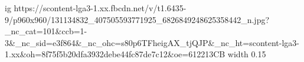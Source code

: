  
 
 
 
 

\par
\ifcmt
  ig https://scontent-lga3-1.xx.fbcdn.net/v/t1.6435-9/p960x960/131134832_407505593771925_6826849248625358442_n.jpg?_nc_cat=101&ccb=1-3&_nc_sid=e3f864&_nc_ohc=s80p6TFheigAX_tjQJP&_nc_ht=scontent-lga3-1.xx&oh=8f75f5b20dfa3932debe44fc87de7c12&oe=612213CB
  width 0.15
\fi
